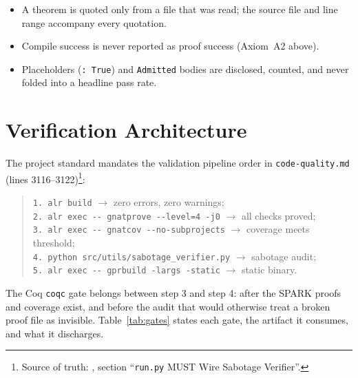 \documentclass[11pt]{article}
\theoremstyle{definition}
\begin{document}
\begin{itemize}
\item A theorem is quoted only from a file that was read; the source file
  and line range accompany every quotation.
\item Compile success is never reported as proof success (Axiom~A2 above).
\item Placeholders (\texttt{: True}) and \texttt{Admitted} bodies are
  disclosed, counted, and never folded into a headline pass rate.
\end{itemize}

\section{Verification Architecture}\label{sec:arch}

The project standard mandates the validation pipeline order in
\texttt{code-quality.md} (lines 3116--3122)\footnote{Source of truth:
,
section ``\texttt{run.py} MUST Wire Sabotage Verifier''.}:

\begin{quote}
\verb|1. alr build| $\to$ zero errors, zero warnings;\\
\verb|2. alr exec -- gnatprove --level=4 -j0| $\to$ all checks proved;\\
\verb|3. alr exec -- gnatcov --no-subprojects| $\to$ coverage meets threshold;\\
\verb|4. python src/utils/sabotage_verifier.py| $\to$ sabotage audit;\\
\verb|5. alr exec -- gprbuild -largs -static| $\to$ static binary.
\end{quote}

The Coq \texttt{coqc} gate belongs between step 3 and step 4: after the
SPARK proofs and coverage exist, and before the audit that would otherwise
treat a broken proof file as invisible. Table~\ref{tab:gates} states each
gate, the artifact it consumes, and what it discharges.
\end{document}
